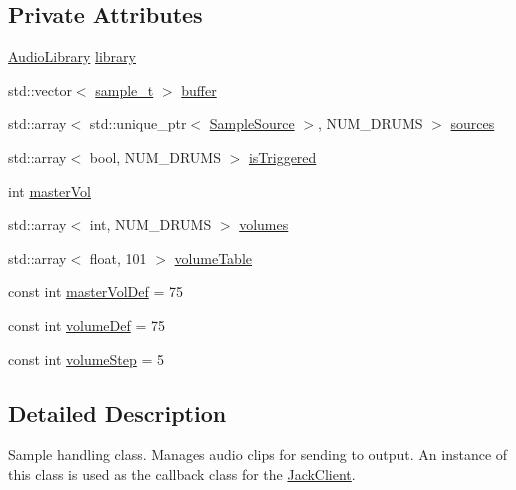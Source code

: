 \subsection*{Private Attributes}
\begin{DoxyCompactItemize}
\item 
\hyperlink{classdrumpi_1_1audio_1_1AudioLibrary}{Audio\+Library} \hyperlink{classdrumpi_1_1audio_1_1PlaybackEngine_adb36e7fbdbf5155b9be32572fe2e74e7}{library}
\item 
std\+::vector$<$ \hyperlink{namespacedrumpi_1_1audio_aca0bdc9164f87b72057e284442abab6e}{sample\+\_\+t} $>$ \hyperlink{classdrumpi_1_1audio_1_1PlaybackEngine_af0c95ccde3dfb68503e775c50e65cd12}{buffer}
\item 
std\+::array$<$ std\+::unique\+\_\+ptr$<$ \hyperlink{classdrumpi_1_1audio_1_1SampleSource}{Sample\+Source} $>$, N\+U\+M\+\_\+\+D\+R\+U\+MS $>$ \hyperlink{classdrumpi_1_1audio_1_1PlaybackEngine_afe51646f62d3e7826f12f1fc4f90f57d}{sources}
\item 
std\+::array$<$ bool, N\+U\+M\+\_\+\+D\+R\+U\+MS $>$ \hyperlink{classdrumpi_1_1audio_1_1PlaybackEngine_a2ac98f97a163dfe1dd92da37722af803}{is\+Triggered}
\item 
int \hyperlink{classdrumpi_1_1audio_1_1PlaybackEngine_a3c706082f62476c77d9c95cee4828d12}{master\+Vol}
\item 
std\+::array$<$ int, N\+U\+M\+\_\+\+D\+R\+U\+MS $>$ \hyperlink{classdrumpi_1_1audio_1_1PlaybackEngine_af59868fe0bc057b1ae6bd00cbd795c56}{volumes}
\item 
std\+::array$<$ float, 101 $>$ \hyperlink{classdrumpi_1_1audio_1_1PlaybackEngine_ab546a7b63e007c69c7249f867768af0b}{volume\+Table}
\item 
const int \hyperlink{classdrumpi_1_1audio_1_1PlaybackEngine_a541e7697fd085bff60d86f3179f73f44}{master\+Vol\+Def} = 75
\item 
const int \hyperlink{classdrumpi_1_1audio_1_1PlaybackEngine_a701c2d92f46ae1f0d9654de2effd0145}{volume\+Def} = 75
\item 
const int \hyperlink{classdrumpi_1_1audio_1_1PlaybackEngine_a21a70337c53b12ff8e47662911bde068}{volume\+Step} = 5
\end{DoxyCompactItemize}


\subsection{Detailed Description}
Sample handling class. Manages audio clips for sending to output. An instance of this class is used as the callback class for the \hyperlink{classdrumpi_1_1audio_1_1JackClient}{Jack\+Client}. 

